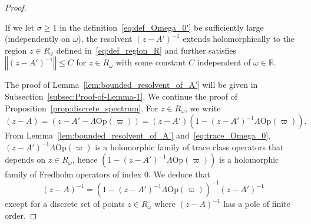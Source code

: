 \documentclass[AHL,Unicode,longabstracts,published]{cedram}
\newcommand{\Opp}{\mathrm{Op}}
\newcommand{\bbR}{\mathbb{R}}
\newcommand{\bbR}{\mathbb{R}}
\begin{document}
\begin{proof}
\begin{cBoxB}{}
\begin{lem}\label{lem:bounded_resolvent_of_A'}
If we let $\sigma\geq1$ in the definition~\eqref{eq:def_Omega_0'} be sufficiently large (independently on $\omega$), the resolvent $(z-A')^{-1}$ extends holomorphically to the region $z\in R_{\omega}$ defined in~\eqref{eq:def_region_R} and further satisfies $\left\Vert (z-A')^{-1}\right\Vert \leq C$ for $z\in R_{\omega}$ with some constant $C$ independent of $\omega\in\bbR$.
\end{lem}
\end{cBoxB}

The proof of Lemma~\ref{lem:bounded_resolvent_of_A'} will be given in Subsection~\ref{subsec:Proof-of-Lemma-1}. We continue the proof of Proposition~\ref{prop:discrete_spectrum}. For $z\in R_{\omega}$, we write
\[
\left(z-A\right)=\left(z-A'-\Lambda\Opp \left(\varpi\right)\right)=\left(z-A'\right)\left(1-\left(z-A'\right)^{-1}\Lambda\Opp \left(\varpi\right)\right).
\]
From Lemma~\ref{lem:bounded_resolvent_of_A'} and~\eqref{eq:trace_Omega_0}, $(z-A')^{-1}\Lambda\Opp (\varpi)$ is a holomorphic family of trace class operators that depends on $z\in R_{\omega}$, hence $(1-(z-A')^{-1}\Lambda\Opp (\varpi))$ is a holomorphic family of Fredholm operators of index $0$. We deduce that
\[
\left(z-A\right)^{-1}=\left(1-\left(z-A'\right)^{-1}\Lambda\Opp \left(\varpi\right)\right)^{-1}\left(z-A'\right)^{-1}
\]
except for a discrete set of points $z\in R_{\omega}$ where $(z-A)^{-1}$ has a pole of finite order.


\end{proof}
\end{document}
